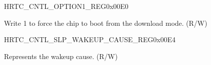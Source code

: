 \begin{register}{H}{RTC\_CNTL\_OPTION1\_REG}{0x00E0}\label{regdesc:RTCCNTLOPTION1REG}
%
%
\regnewline%
\begin{regdesc}\begin{reglist}
\label{fielddesc:RTCCNTLFORCEDOWNLOADBOOT}\item [RTC\_CNTL\_FORCE\_DOWNLOAD\_BOOT] Write 1 to force the chip to boot from the download mode. (R/W)
\end{reglist}\end{regdesc}
\end{register}


\begin{register}{H}{RTC\_CNTL\_SLP\_WAKEUP\_CAUSE\_REG}{0x00E4}\label{regdesc:RTCCNTLSLPWAKEUPCAUSEREG}
%
%
\regnewline%
\begin{regdesc}\begin{reglist}
\label{fielddesc:RTCCNTLWAKEUPCAUSE}\item [RTC\_CNTL\_WAKEUP\_CAUSE] Represents the wakeup cause. (R/W)
\end{reglist}\end{regdesc}
\end{register}


